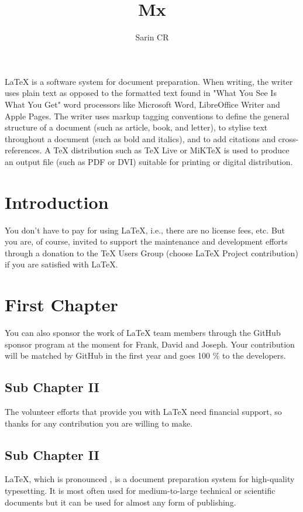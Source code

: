 \documentclass[10pt,a4paper]{article}
\title{Mx}
\author{Sarin CR}
\begin{document}
\maketitle
LaTeX  is a software system for document preparation. When writing, the writer uses plain text as opposed to the formatted text found in "What You See Is What You Get" word processors like Microsoft Word, LibreOffice Writer and Apple Pages. The writer uses markup tagging conventions to define the general structure of a document (such as article, book, and letter), to stylise text throughout a document (such as bold and italics), and to add citations and cross-references. A TeX distribution such as TeX Live or MiKTeX is used to produce an output file (such as PDF or DVI) suitable for printing or digital distribution. 
\section{Introduction}
You don't have to pay for using LaTeX, i.e., there are no license fees, etc. But you are, of course, invited to support the maintenance and development efforts through a donation to the TeX Users Group (choose LaTeX Project contribution) if you are satisfied with LaTeX.
\section{First Chapter}
You can also sponsor the work of LaTeX team members through the GitHub sponsor program at the moment for Frank, David and Joseph. Your contribution will be matched by GitHub in the first year and goes 100 \% to the developers. 
\subsection{Sub Chapter II}
The volunteer efforts that provide you with LaTeX need financial support, so thanks for any contribution you are willing to make.
\subsection{Sub Chapter II}
LaTeX, which is pronounced  , is a document preparation system for high-quality typesetting. It is most often used for medium-to-large technical or scientific documents but it can be used for almost any form of publishing.
\end{document}
